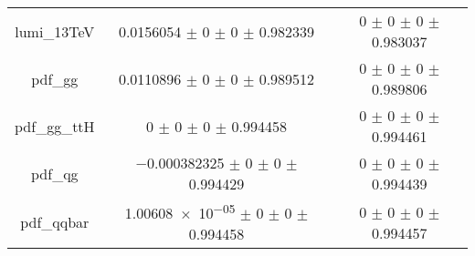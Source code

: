 \begin{table}
\begin{tabular}{ccc}
lumi\_13TeV & \num{0.0156054} $\pm$ \num{0} $\pm$ \num{0} $\pm$ \num{0.982339} & \num{0} $\pm$ \num{0} $\pm$ \num{0} $\pm$ \num{0.983037}\\
pdf\_gg & \num{0.0110896} $\pm$ \num{0} $\pm$ \num{0} $\pm$ \num{0.989512} & \num{0} $\pm$ \num{0} $\pm$ \num{0} $\pm$ \num{0.989806}\\
pdf\_gg\_ttH & \num{0} $\pm$ \num{0} $\pm$ \num{0} $\pm$ \num{0.994458} & \num{0} $\pm$ \num{0} $\pm$ \num{0} $\pm$ \num{0.994461}\\
pdf\_qg & \num{-0.000382325} $\pm$ \num{0} $\pm$ \num{0} $\pm$ \num{0.994429} & \num{0} $\pm$ \num{0} $\pm$ \num{0} $\pm$ \num{0.994439}\\
pdf\_qqbar & \num{1.00608e-05} $\pm$ \num{0} $\pm$ \num{0} $\pm$ \num{0.994458} & \num{0} $\pm$ \num{0} $\pm$ \num{0} $\pm$ \num{0.994457}\\
\bottomrule
\end{tabular}
\end{table}